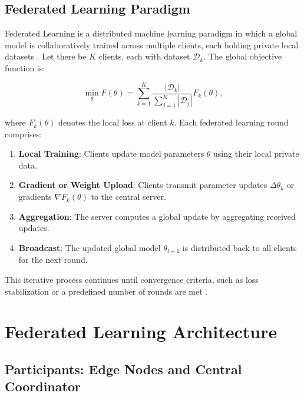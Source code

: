 \subsection{Federated Learning Paradigm}
\label{subsec:fl_paradigm}

Federated Learning is a distributed machine learning paradigm in which a global 
model is collaboratively trained across multiple clients, each holding private 
local datasets \cite{mcmahan2017communication}. Let there be $K$ clients, each 
with dataset $\mathcal{D}_k$. The global objective function is:

\begin{equation}
    \min_{\theta} F(\theta) = \sum_{k=1}^{K} \frac{|\mathcal{D}_k|}{\sum_{j=1}^{K} |\mathcal{D}_j|} F_k(\theta),
\end{equation}

where $F_k(\theta)$ denotes the local loss at client $k$. Each federated learning 
round comprises:

\begin{enumerate}
    \item \textbf{Local Training}: Clients update model parameters $\theta$ using 
    their local private data.
    
    \item \textbf{Gradient or Weight Upload}: Clients transmit parameter updates 
    $\Delta \theta_k$ or gradients $\nabla F_k(\theta)$ to the central server.
    
    \item \textbf{Aggregation}: The server computes a global update by aggregating 
    received updates.
    
    \item \textbf{Broadcast}: The updated global model $\theta_{t+1}$ is distributed 
    back to all clients for the next round.
\end{enumerate}

This iterative process continues until convergence criteria, such as loss 
stabilization or a predefined number of rounds are met \cite{li2020federated}.

\section{Federated Learning Architecture}
\label{sec:fl_architecture}

\subsection{Participants: Edge Nodes and Central Coordinator}
\label{subsec:fl_participants}

